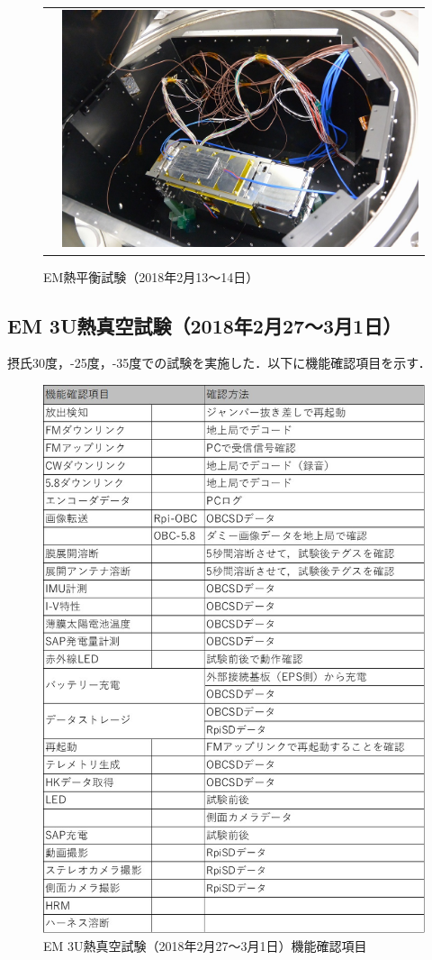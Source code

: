 \begin{figure}[H]
\begin{tabular}{cc}
\begin{minipage}{0.5\hsize}
\begin{center}
	\end{center}
\end{minipage}&
\begin{minipage}{0.5\hsize}
	\begin{center}
		\includegraphics[width=1\textwidth]{04/fig/4-8-1-4.jpg}
	\end{center}
\end{minipage}
\end{tabular}
		\caption{EM熱平衡試験（2018年2月13～14日）}
	\label{fig4-8-1-1}
\end{figure}

\subsection{EM 3U熱真空試験（2018年2月27～3月1日）}

摂氏30度，-25度，-35度での試験を実施した．以下に機能確認項目を示す．

\begin{figure}[H]
	\centering
				\includegraphics[width=.5\textwidth]{04/fig/4-8-2-1.jpg}
		\caption{EM 3U熱真空試験（2018年2月27～3月1日）機能確認項目}
	\label{fig4-8-2-1}
\end{figure}

